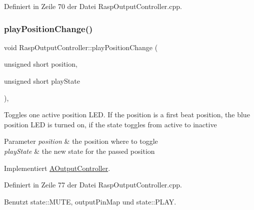 Definiert in Zeile 70 der Datei Rasp\+Output\+Controller.\+cpp.

\mbox{\label{class_rasp_output_controller_a0778395ee8ec044d04fbfcb2f3b2eb04}} 
\subsubsection{\texorpdfstring{play\+Position\+Change()}{playPositionChange()}\hspace{0.1cm}{\footnotesize\ttfamily [2/2]}}
{\footnotesize\ttfamily void Rasp\+Output\+Controller\+::play\+Position\+Change (\begin{DoxyParamCaption}\item[{unsigned short}]{position,  }\item[{unsigned short}]{play\+State }\end{DoxyParamCaption})\hspace{0.3cm}{\ttfamily [override]}, {\ttfamily [virtual]}}

Toggles one active position L\+ED. If the position is a first beat position, the blue position L\+ED is turned on, if the state toggles from active to inactive 
\begin{DoxyParams}{Parameter}
{\em position} & the position where to toggle \\
\hline
{\em play\+State} & the new state for the passed position \\
\hline
\end{DoxyParams}


Implementiert \hyperlink{class_a_output_controller_a15c1300df5606bf7d4838b41a45c31e3}{A\+Output\+Controller}.



Definiert in Zeile 77 der Datei Rasp\+Output\+Controller.\+cpp.



Benutzt state\+::\+M\+U\+TE, output\+Pin\+Map und state\+::\+P\+L\+AY.

\mbox{\label{class_rasp_output_controller_afce87d510c0564567e4250b22639d5e0}} 
